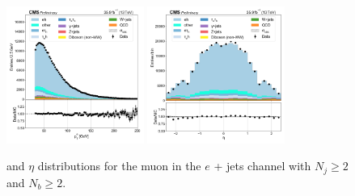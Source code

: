 \begin{figure}[htb!]
    \centering
    \includegraphics[width=0.4\textwidth]{chapters/Appendix/sectionPlots/figures/data_mc_overlays/ejet_2016_cat_gt4_gt2_signal_linear_lepton_lepton1_pt}
    \includegraphics[width=0.4\textwidth]{chapters/Appendix/sectionPlots/figures/data_mc_overlays/ejet_2016_cat_gt4_gt2_signal_linear_lepton_lepton1_eta}
    \caption{\pt and $\eta$ distributions for the muon in the $e$ + jets
    channel with $N_{j} \geq 2$ and $N_{b} \geq 2$.
    \label{fig:ejet_2_kinematic}}
\end{figure}

